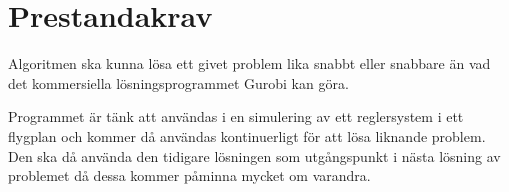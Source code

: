 \section{Prestandakrav}
Algoritmen ska kunna lösa ett givet problem lika snabbt eller snabbare än vad det kommersiella lösningsprogrammet Gurobi kan göra. 

Programmet är tänk att användas i en simulering av ett reglersystem i ett flygplan och kommer då användas kontinuerligt för att lösa liknande problem. Den ska då använda den tidigare lösningen som utgångspunkt i nästa lösning av problemet då dessa kommer påminna mycket om varandra.
\begin{LIPSkravlista}
\end{LIPSkravlista}
